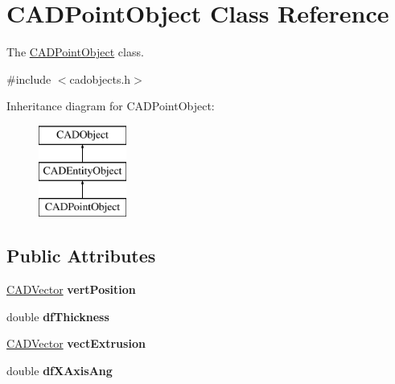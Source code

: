\hypertarget{class_c_a_d_point_object}{}\section{C\+A\+D\+Point\+Object Class Reference}
\label{class_c_a_d_point_object}


The \hyperlink{class_c_a_d_point_object}{C\+A\+D\+Point\+Object} class.  




{\ttfamily \#include $<$cadobjects.\+h$>$}

Inheritance diagram for C\+A\+D\+Point\+Object\+:\begin{figure}[H]
\begin{center}
\leavevmode
\includegraphics[height=3.000000cm]{class_c_a_d_point_object}
\end{center}
\end{figure}
\subsection*{Public Attributes}
\begin{DoxyCompactItemize}
\item 
\hyperlink{class_c_a_d_vector}{C\+A\+D\+Vector} {\bfseries vert\+Position}\hypertarget{class_c_a_d_point_object_a16ef3ec7b39f839b9306a55030bdc9e1}{}\label{class_c_a_d_point_object_a16ef3ec7b39f839b9306a55030bdc9e1}

\item 
double {\bfseries df\+Thickness}\hypertarget{class_c_a_d_point_object_a426a51a6aab35e4ff94eed1cfb84e90c}{}\label{class_c_a_d_point_object_a426a51a6aab35e4ff94eed1cfb84e90c}

\item 
\hyperlink{class_c_a_d_vector}{C\+A\+D\+Vector} {\bfseries vect\+Extrusion}\hypertarget{class_c_a_d_point_object_a8d1aeb32e255999dc87cc62beda52fe9}{}\label{class_c_a_d_point_object_a8d1aeb32e255999dc87cc62beda52fe9}

\item 
double {\bfseries df\+X\+Axis\+Ang}\hypertarget{class_c_a_d_point_object_aee7723e53b1a8ef3a1a1eda36775a32e}{}\label{class_c_a_d_point_object_aee7723e53b1a8ef3a1a1eda36775a32e}

\end{DoxyCompactItemize}
